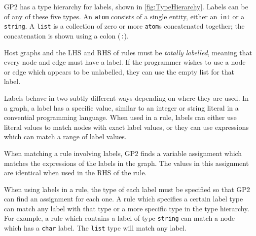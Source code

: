 \documentclass[authoryearcitations]{UoYCSproject}
\begin{document}
GP2 has a type hierarchy for labels, shown in \autoref{fig:TypeHierarchy}. Labels
can be of any of these five types. An \texttt{atom} consists of a single entity,
either an \texttt{int} or a \texttt{string}. A \texttt{list} is a collection of
zero or more \texttt{atom}s concatenated together; the concatenation is shown using
a colon (\texttt{:}).

Host graphs and the LHS and RHS of rules must be \emph{totally labelled}, meaning
that every node and edge must have a label. If the programmer wishes to use a node
or edge which appears to be unlabelled, they can use the empty list for that label.

Labels behave in two subtly different ways depending on where they are used. In a
graph, a label has a specific value, similar to an integer or string literal in a
convential programming language. When used in a rule, labels can either use literal
values to match nodes with exact label values, or they can use expressions which
can match a range of label values.

When matching a rule involving labels, GP2 finds a variable assignment which
matches the expressions of the labels in the graph. The values in this assignment
are identical when used in the RHS of the rule.

When using labels in a rule, the type of each label must be specified so that GP2
can find an assignment for each one. A rule which specifies a certain label type
can match any label with that type or a more specific type in the type hierarchy.
For example, a rule which contains a label of type \texttt{string} can match a
node which has a \texttt{char} label. The \texttt{list} type will match any label.
\end{document}
